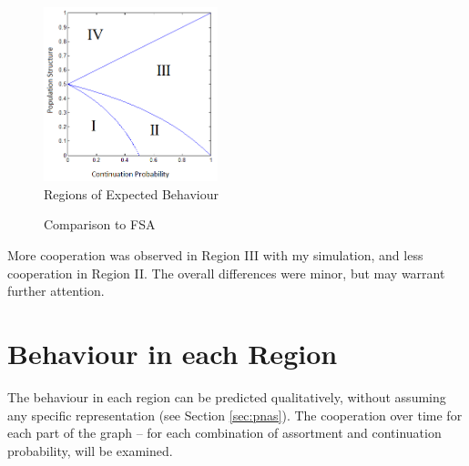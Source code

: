 \documentclass[a4paper,11pt,bcshonoursthesis,singlespace,oneside,thesisdraft,pdflatex]{cssethesis}
\begin{document}
\begin{figure}[h]
\center
\includegraphics[width=0.45\textwidth]{regions}
\caption{Regions of Expected Behaviour}
\label{fig:regions2}
\end{figure}

\begin{figure}[h]
\caption{Comparison to FSA}
\label{fig:comparison}
\end{figure}

More cooperation was observed in Region III with my simulation, and less cooperation in Region II. 
The overall differences were minor, but may warrant further attention. 

\section{Behaviour in each Region}
\label{sec:regions}
The behaviour in each region can be predicted qualitatively, without assuming any specific representation (see Section \ref{sec:pnas}). 
The cooperation over time for each part of the graph -- for each combination of assortment and continuation probability, will be examined. 
\end{document}
